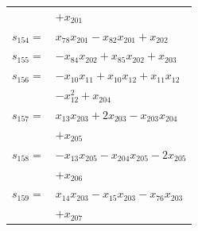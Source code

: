 \begin{longtable}{@{}r@{\;}l@{}}
 & \(\displaystyle +x_{201}\) \\[3pt]
\(s_{154}=\) & \(\displaystyle x_{78}x_{201} -x_{82}x_{201} +x_{202}\) \\[3pt]
\(s_{155}=\) & \(\displaystyle -x_{84}x_{202} +x_{85}x_{202} +x_{203}\) \\[3pt]
\(s_{156}=\) & \(\displaystyle -x_{10}x_{11} +x_{10}x_{12} +x_{11}x_{12}\) \\
 & \(\displaystyle -x_{12}^{2} +x_{204}\) \\[3pt]
\(s_{157}=\) & \(\displaystyle x_{13}x_{203} +2x_{203} -x_{203}x_{204}\) \\
 & \(\displaystyle +x_{205}\) \\[3pt]
\(s_{158}=\) & \(\displaystyle -x_{13}x_{205} -x_{204}x_{205} -2x_{205}\) \\
 & \(\displaystyle +x_{206}\) \\[3pt]
\(s_{159}=\) & \(\displaystyle x_{14}x_{203} -x_{15}x_{203} -x_{76}x_{203}\) \\
 & \(\displaystyle +x_{207}\) \\[3pt]
\end{longtable}
\endgroup
